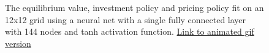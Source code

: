 \documentclass[12pt]{article}
\begin{document}
\begin{figure}[H]
  \centering
  \caption{The equilibrium value, investment policy and pricing policy fit on an 12x12 grid using a neural net with a single fully connected layer with 144 nodes and tanh activation function. \href{https://github.com/wmjones/VFA-for-dynamic-games/blob/master/gifs/gif_ann_12.gif}{Link to animated gif version}}
\end{figure}
\end{document}
